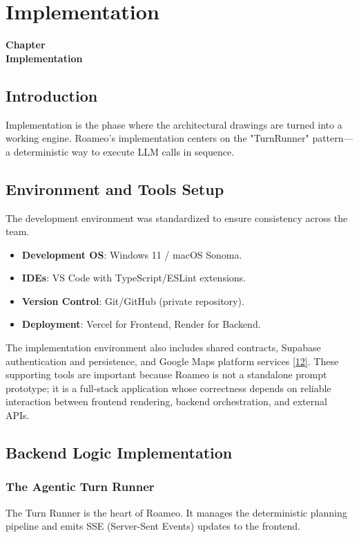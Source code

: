 \documentclass[12pt,a4paper]{report}
\newcommand{\chapcite}[1]{\hyperlink{ref:#1}{[#1]}}
\newcommand{\chapcitetarget}[1]{\hypertarget{cite:#1}{}\chapcite{#1}}
\newcommand{\chaptercontentheading}[1]{%
  \thispagestyle{mainstyle}%
  \begin{center}
    {\Large\bfseries Chapter~\thechapter}\\[0.35cm]
    {\Large\bfseries #1}
  \end{center}
  \vspace{0.9cm}
}
\begin{document}
\chapter{Implementation}
\chaptercontentheading{Implementation}

\section{Introduction}

Implementation is the phase where the architectural drawings are turned into a working engine. Roameo's implementation centers on the "TurnRunner" pattern---a deterministic way to execute LLM calls in sequence.

\section{Environment and Tools Setup}

The development environment was standardized to ensure consistency across the team.

\begin{itemize}[nosep]
    \item \textbf{Development OS}: Windows 11 / macOS Sonoma.
    \item \textbf{IDEs}: VS Code with TypeScript/ESLint extensions.
    \item \textbf{Version Control}: Git/GitHub (private repository).
    \item \textbf{Deployment}: Vercel for Frontend, Render for Backend.
\end{itemize}

The implementation environment also includes shared contracts, Supabase authentication and persistence, and Google Maps platform services \chapcitetarget{12}. These supporting tools are important because Roameo is not a standalone prompt prototype; it is a full-stack application whose correctness depends on reliable interaction between frontend rendering, backend orchestration, and external APIs.

\section{Backend Logic Implementation}

\subsection{The Agentic Turn Runner}
The Turn Runner is the heart of Roameo. It manages the deterministic planning pipeline and emits SSE (Server-Sent Events) updates to the frontend.
\end{document}
